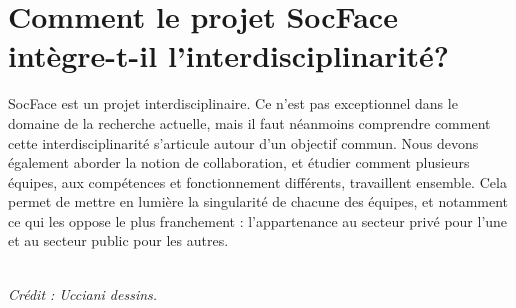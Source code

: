 \documentclass[a4paper,12pt,twoside]{book}
\begin{document}
	\mainmatter

	\part{Comment le projet SocFace intègre-t-il l'interdisciplinarité?}

 SocFace est un projet interdisciplinaire. Ce n’est pas exceptionnel dans le domaine de la recherche actuelle, mais il faut néanmoins comprendre comment cette interdisciplinarité s’articule autour d’un objectif commun. Nous devons également aborder la notion de collaboration, et étudier comment plusieurs équipes, aux compétences et fonctionnement différents, travaillent ensemble. Cela permet de mettre en lumière la singularité de chacune des équipes, et notamment ce qui les oppose le plus franchement : l’appartenance au secteur privé pour l’une et au secteur public pour les autres. 
\vspace*{\fill}
\begin{center}
  \setlength{\fboxsep}{5pt}  %
  \setlength{\fboxrule}{1pt} %
  \\
    \vspace{0.5em} %
    {\scriptsize \textit{Crédit : Ucciani dessins.}}
\end{center} 



	
\end{document}
